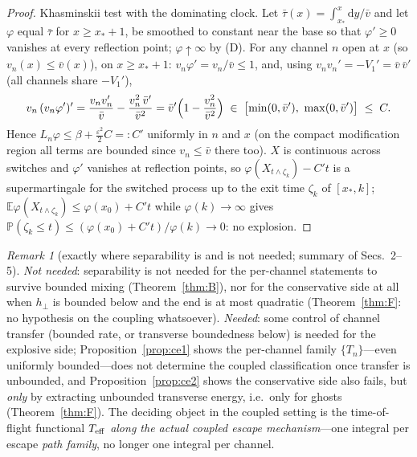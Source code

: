 \documentclass[11pt]{article}
\theoremstyle{remark}
\newtheorem{remark}[theorem]{Remark}
\newcommand{\dd}{\mathrm{d}}
\newcommand{\E}{\mathbb{E}}
\newcommand{\Prob}{\mathbb{P}}
\begin{document}
\begin{proof}
Khasminskii test with the dominating clock.  Let
$\bar\tau(x)=\int_{x_{*}}^{x}\dd y/\bar v$ and let $\varphi$ equal
$\bar\tau$ for $x\ge x_{*}+1$, be smoothed to constant near the base so
that $\varphi'\ge0$ vanishes at every reflection point;
$\varphi\uparrow\infty$ by (D).  For any channel $n$ open at $x$
(so $v_{n}(x)\le\bar v(x)$), on $x\ge x_{*}+1$:
$v_{n}\varphi'=v_{n}/\bar v\le1$, and, using
$v_{n}v_{n}'=-V_{1}'=\bar v\,\bar v'$ (all channels share
$-V_{1}'$),
\[
v_{n}\,( v_{n}\varphi')'
= \frac{v_{n}v_{n}'}{\bar v}-\frac{v_{n}^{2}\,\bar v'}{\bar v^{2}}
= \bar v'\Bigl(1-\frac{v_{n}^{2}}{\bar v^{2}}\Bigr)
\;\in\;\bigl[\min(0,\bar v'),\ \max(0,\bar v')\bigr]
\;\le\;C .
\]
Hence $L_{n}\varphi\le\beta+\tfrac{\varepsilon^{2}}{2}C=:C'$ uniformly
in $n$ and $x$ (on the compact modification region all terms are
bounded since $v_{n}\le\bar v$ there too).  $X$ is continuous across
switches and $\varphi'$ vanishes at reflection points, so
$\varphi(X_{t\wedge\zeta_{k}})-C't$ is a supermartingale for the
switched process up to the exit time $\zeta_{k}$ of $[x_{*},k]$;
$\E\varphi(X_{t\wedge\zeta_{k}})\le\varphi(x_{0})+C't$ while
$\varphi(k)\to\infty$ gives
$\Prob(\zeta_{k}\le t)\le(\varphi(x_{0})+C't)/\varphi(k)\to0$: no
explosion.
\end{proof}

\begin{remark}[exactly where separability is and is not needed;
summary of Secs.~2--5]
\emph{Not needed}: separability is not needed for the per-channel
statements to survive bounded mixing (Theorem~\ref{thm:B}), nor for
the conservative side at all when $h_{\perp}$ is bounded below and the
end is at most quadratic (Theorem~\ref{thm:F}: no hypothesis on the
coupling whatsoever).  \emph{Needed}: some control of channel transfer
(bounded rate, or transverse boundedness below) is needed for the
explosive side; Proposition~\ref{prop:ce1} shows the per-channel family
$\{T_{n}\}$---even uniformly bounded---does not determine the coupled
classification once transfer is unbounded, and
Proposition~\ref{prop:ce2} shows the conservative side also fails, but
\emph{only} by extracting unbounded transverse energy, i.e.\ only for
ghosts (Theorem~\ref{thm:F}).  The deciding object in the coupled
setting is the time-of-flight functional $T_{\rm eff}$ \emph{along the
actual coupled escape mechanism}---one integral per escape
\emph{path family}, no longer one integral per channel.
\end{remark}
\end{document}

